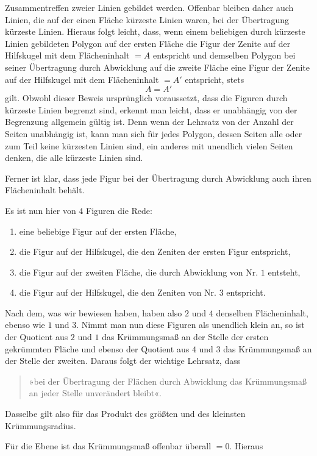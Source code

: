 %
Zusammentreffen zweier Linien gebildet werden. Offenbar bleiben daher auch Linien, die auf der einen Fläche kürzeste Linien waren, bei der Übertragung kürzeste Linien. Hieraus folgt leicht, dass, wenn einem beliebigen durch kürzeste Linien gebildeten Polygon auf der ersten Fläche die Figur der Zenite auf der Hilfskugel mit dem Flächeninhalt $=A$ entspricht und demselben Polygon bei seiner Übertragung durch Abwicklung auf die zweite Fläche eine Figur der Zenite auf der Hilfskugel mit dem Flächeninhalt $=A'$ entspricht, stets
\[
A=A'
\]
gilt. Obwohl dieser Beweis ursprünglich voraussetzt, dass die Figuren durch kürzeste Linien begrenzt sind, erkennt man leicht, dass er unabhängig von der Begrenzung allgemein gültig ist. Denn wenn der Lehrsatz von der Anzahl der Seiten unabhängig ist, kann man sich für jedes Polygon, dessen Seiten alle oder zum Teil keine kürzesten Linien sind, ein anderes mit unendlich vielen Seiten denken, die alle kürzeste Linien sind.

Ferner ist klar, dass jede Figur bei der Übertragung durch Abwicklung auch ihren Flächeninhalt behält.

Es ist nun hier von $4$ Figuren die Rede:
\begin{enumerate}
\item[1)] eine beliebige Figur auf der ersten Fläche,
\item[2)] die Figur auf der Hilfskugel, die den Zeniten der ersten Figur entspricht,
\item[3)] die Figur auf der zweiten Fläche, die durch Abwicklung von Nr. $1$ entsteht,
\item[4)] die Figur auf der Hilfskugel, die den Zeniten von Nr. $3$ entspricht.
\end{enumerate}
\noindent\hspace*{1.2em}Nach dem, was wir bewiesen haben, haben also $2$ und $4$ denselben Flächeninhalt, ebenso wie $1$ und $3$. Nimmt man nun diese Figuren als unendlich klein an, so ist der Quotient aus $2$ und $1$ das Krümmungsmaß an der Stelle der ersten gekrümmten Fläche und ebenso der Quotient aus $4$ und $3$ das Krümmungsmaß an der Stelle der zweiten. Daraus folgt der wichtige Lehrsatz, dass
\begin{quote}
»bei der Übertragung der Flächen durch Abwicklung das Krümmungsmaß an jeder Stelle unverändert bleibt«.
\end{quote}
\noindent Dasselbe gilt also für das Produkt des größten und des kleinsten Krümmungsradius.

Für die Ebene ist das Krümmungsmaß offenbar überall $=0$. Hieraus
